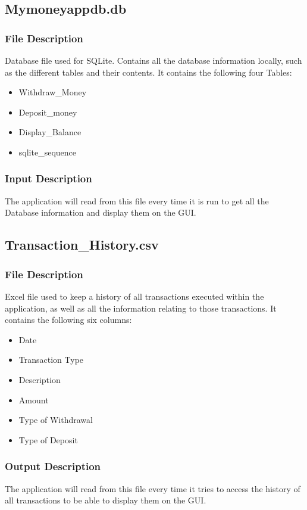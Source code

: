 \documentclass[12pt]{article}
\begin{document}
\subsection{Mymoneyappdb.db}

\subsubsection{File Description}
Database file used for SQLite. Contains all the database information locally, such as the different tables and their contents. It contains the following four Tables:
\begin{itemize}
  \item Withdraw\_Money
  \item Deposit\_money
  \item Display\_Balance
  \item sqlite\_sequence
\end{itemize}

\subsubsection{Input Description}
The application will read from this file every time it is run to get all the Database information and display them on the GUI.

\subsection{Transaction\_History.csv}

\subsubsection{File Description}
Excel file used to keep a history of all transactions executed within the application, as well as all the information relating to those transactions. It contains the following six columns:
\begin{itemize}
  \item Date
  \item Transaction Type
  \item Description
  \item Amount
  \item Type of Withdrawal
  \item Type of Deposit
\end{itemize}

\subsubsection{Output Description}
The application will read from this file every time it tries to access the history of all transactions to be able to display them on the GUI.
\end{document}
